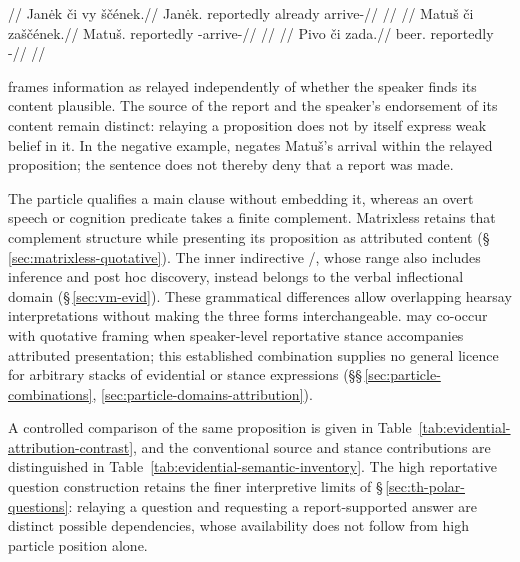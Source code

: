 \pex
\a
\begingl
\glpreamble {}//
\gla Janėk či vy ščének.//
\glb Janėk.\Dir{} reportedly already arrive-\Pf{}//
\glft {}//
\endgl
\a
\begingl
\glpreamble {}//
\gla Matuš či zaščének.//
\glb Matuš.\Dir{} reportedly \Neg{}-arrive-\Pf{}//
\glft {}//
\endgl
\a
\begingl
\glpreamble {}//
\gla Pivo či zada.//
\glb beer.\Dir{} reportedly \NegExst{}-\Cont{}//
\glft {}//
\endgl
\xe

\noindent {} frames information as relayed independently of whether
the speaker finds its content plausible. The source of the report and the
speaker's endorsement of its content remain distinct: relaying a proposition
does not by itself express weak belief in it. In the negative example,
 negates Matuš's arrival within the relayed proposition; the
sentence does not thereby deny that a report was made.

The particle qualifies a main clause without embedding it, whereas an overt
speech or cognition predicate takes a finite complement. Matrixless
 retains that complement structure while presenting its
proposition as attributed content (§\,\ref{sec:matrixless-quotative}).
The inner indirective /, whose range also includes
inference and post hoc discovery, instead belongs to the verbal
inflectional domain (§\,\ref{sec:vm-evid}). These grammatical differences
allow overlapping hearsay interpretations without making the three forms
interchangeable.  may co-occur with quotative framing when
speaker-level reportative stance accompanies attributed presentation;
this established combination supplies no general licence for arbitrary
stacks of evidential or stance expressions
(§§\,\ref{sec:particle-combinations},
\ref{sec:particle-domains-attribution}).

A controlled comparison of the same proposition is given in
Table~\ref{tab:evidential-attribution-contrast}, and the conventional
source and stance contributions are distinguished in
Table~\ref{tab:evidential-semantic-inventory}. The high reportative
question construction  retains the finer interpretive limits
of §\,\ref{sec:th-polar-questions}: relaying a question and requesting
a report-supported answer are distinct possible dependencies, whose
availability does not follow from high particle position alone.

